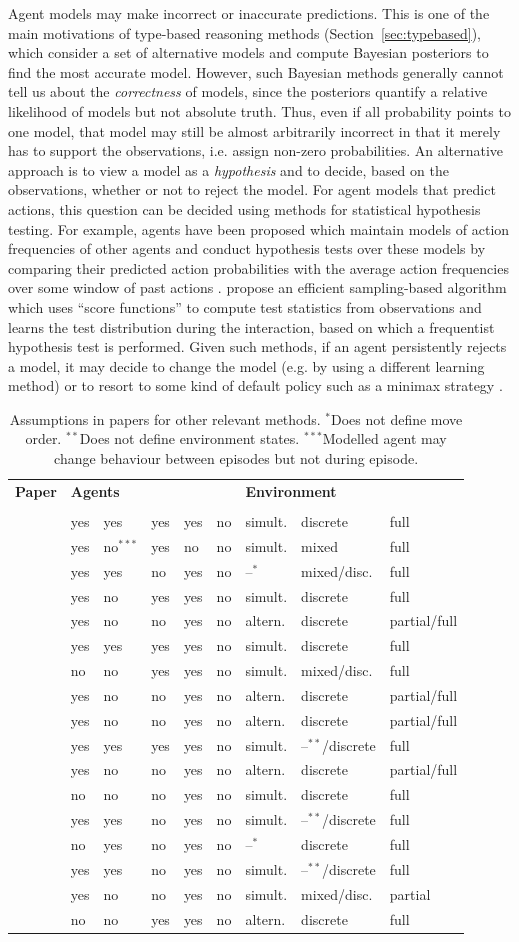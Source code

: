 \documentclass[final,1p,times,authoryear]{elsarticle}
\makeatletter
\newcommand{\nil}{@{}}
\newcommand{\nl}{\newline}
\newcommand{\rbox}[2]{\rotatebox{45}{\parbox{#1\textwidth}{#2}}}
\newcommand{\btab}{
	\center
	\scriptsize
	\bgroup\def\arraystretch{1.2}
	\begin{tabular}{\nil p{0.32\textwidth} @{\hspace{11pt}} l \nil l \nil l \nil l \nil l \nil l \nil l \nil l \nil}
		\toprule
		\bf Paper	& \multicolumn{5}{l}{\hspace{-5pt}\bf Agents} & \multicolumn{3}{l}{\hspace{-5pt}\bf Environment} \\[-5pt]
				& \rbox{0.075}{Stochastic \nl actions?} & \rbox{0.075}{Changing \nl behaviour?} & \rbox{0.075}{Factors \nl known?} & \rbox{0.07}{Independent \nl agents?} & \rbox{0.06}{Common \nl goals?} & \rbox{0.10}{Move order} & \rbox{0.11}{State/action \nl representation} & \rbox{0.09}{State/action \nl observability} \\
		\midrule}
\newcommand{\tabrow}[9]{\citep{#1} & #2 & #3 & #4 & #5 & #6 & #7 & #8 & #9 \\}
\newcommand{\etab}{
		\bottomrule
	\end{tabular}
	\egroup}
\newcommand{\si}{simult.}
\newcommand{\al}{altern.}
\newcommand{\as}{$^{*}$}
\newcommand{\ass}{$^{**}$}
\newcommand{\asss}{$^{***}$}
\makeatother
\begin{document}
Agent models may make incorrect or inaccurate predictions. This is one of the main motivations of type-based reasoning methods (Section~\ref{sec:typebased}), which consider a set of alternative models and compute Bayesian posteriors to find the most accurate model. However, such Bayesian methods generally cannot tell us about the \emph{correctness} of models, since the posteriors quantify a relative likelihood of models but not absolute truth. Thus, even if all probability points to one model, that model may still be almost arbitrarily incorrect in that it merely has to support the observations, i.e. assign non-zero probabilities. An alternative approach is to view a model as a \emph{hypothesis} and to decide, based on the observations, whether or not to reject the model. For agent models that predict actions, this question can be decided using methods for statistical hypothesis testing. For example, agents have been proposed which maintain models of action frequencies of other agents and conduct hypothesis tests over these models by comparing their predicted action probabilities with the average action frequencies over some window of past actions \citep{cs2014,cs2007,fy2003}. \citet{ar2015} propose an efficient sampling-based algorithm which uses ``score functions'' to compute test statistics from observations and learns the test distribution during the interaction, based on which a frequentist hypothesis test is performed. Given such methods, if an agent persistently rejects a model, it may decide to change the model (e.g. by using a different learning method) or to resort to some kind of default policy such as a minimax strategy \citep{nm1944}.

\begin{table}[t]
	\btab
		\tabrow{hzt2017}{yes}{yes}{yes}{yes}{no}{\si}{discrete}{full}
		\tabrow{hbkd2016}{yes}{no\asss}{yes}{no}{no}{\si}{mixed}{full}
		\tabrow{ar2015}{yes}{yes}{no}{yes}{no}{--\as}{mixed/disc.}{full}
		\tabrow{acr2015mipc}{yes}{no}{yes}{yes}{no}{\si}{discrete}{full}
		\tabrow{bjbb2013}{yes}{no}{no}{yes}{no}{\al}{discrete}{partial/full}
		\tabrow{wbmp2011}{yes}{yes}{yes}{yes}{no}{\si}{discrete}{full}
		\tabrow{igos2010}{no}{no}{yes}{yes}{no}{\si}{mixed/disc.}{full}
		\tabrow{jb2009}{yes}{no}{no}{yes}{no}{\al}{discrete}{partial/full}
		\tabrow{jzb2008}{yes}{no}{no}{yes}{no}{\al}{discrete}{partial/full}
		\tabrow{cs2007}{yes}{yes}{yes}{yes}{no}{\si}{--\ass/discrete}{full}
		\tabrow{hshb2005}{yes}{no}{no}{yes}{no}{\al}{discrete}{partial/full}
		\tabrow{mr2005}{no}{no}{no}{yes}{no}{\si}{discrete}{full}
		\tabrow{mb2004}{yes}{yes}{no}{yes}{no}{\si}{--\ass/discrete}{full}
		\tabrow{ges2004}{no}{yes}{no}{yes}{no}{--\as}{discrete}{full}
		\tabrow{fy2003}{yes}{yes}{no}{yes}{no}{\si}{--\ass/discrete}{full}
		\tabrow{srv2000}{yes}{no}{no}{yes}{no}{\si}{mixed/disc.}{partial}
		\tabrow{cm1996search93}{no}{no}{yes}{yes}{no}{\al}{discrete}{full}
	\etab
	\caption{Assumptions in papers for other relevant methods. \as Does not define move order. \ass Does not define environment states. \asss Modelled agent may change behaviour between episodes but not during episode.}
	\label{tab:other}
\end{table}
\end{document}
